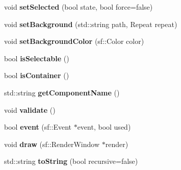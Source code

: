 \begin{DoxyCompactItemize}
\item 
\hypertarget{classgraphics_1_1_container_afb415c1dbd0819dbe0d5ce5dba9e01bc}{void {\bfseries set\-Selected} (bool state, bool force=false)}\label{classgraphics_1_1_container_afb415c1dbd0819dbe0d5ce5dba9e01bc}

\item 
\hypertarget{classgraphics_1_1_container_a6379c94dbd3514a2fb4037f940af52a8}{void {\bfseries set\-Background} (std\-::string path, Repeat repeat)}\label{classgraphics_1_1_container_a6379c94dbd3514a2fb4037f940af52a8}

\item 
\hypertarget{classgraphics_1_1_container_a14a6cc948bdc5efea9108f8d24f84a26}{void {\bfseries set\-Background\-Color} (sf\-::\-Color color)}\label{classgraphics_1_1_container_a14a6cc948bdc5efea9108f8d24f84a26}

\item 
\hypertarget{classgraphics_1_1_container_a7f521fac054bff268374d9809b007b40}{bool {\bfseries is\-Selectable} ()}\label{classgraphics_1_1_container_a7f521fac054bff268374d9809b007b40}

\item 
\hypertarget{classgraphics_1_1_container_af5dd92a421ab134e1fdfd7bedc1db7ef}{bool {\bfseries is\-Container} ()}\label{classgraphics_1_1_container_af5dd92a421ab134e1fdfd7bedc1db7ef}

\item 
\hypertarget{classgraphics_1_1_container_a3cb85f7e3cb06045015d4c49881ac9ba}{std\-::string {\bfseries get\-Component\-Name} ()}\label{classgraphics_1_1_container_a3cb85f7e3cb06045015d4c49881ac9ba}

\item 
\hypertarget{classgraphics_1_1_container_a72ab38a8328ff86a4bf272d6634d7f0d}{void {\bfseries validate} ()}\label{classgraphics_1_1_container_a72ab38a8328ff86a4bf272d6634d7f0d}

\item 
\hypertarget{classgraphics_1_1_container_a11326828e1bcf869654bd69ff40129ff}{bool {\bfseries event} (sf\-::\-Event $\ast$event, bool used)}\label{classgraphics_1_1_container_a11326828e1bcf869654bd69ff40129ff}

\item 
\hypertarget{classgraphics_1_1_container_ae3629f403fa5a48ef1b0f453e702ca3c}{void {\bfseries draw} (sf\-::\-Render\-Window $\ast$render)}\label{classgraphics_1_1_container_ae3629f403fa5a48ef1b0f453e702ca3c}

\item 
\hypertarget{classgraphics_1_1_container_a8a2b6173bfa1c2c554054842144bb526}{std\-::string {\bfseries to\-String} (bool recursive=false)}\label{classgraphics_1_1_container_a8a2b6173bfa1c2c554054842144bb526}

\end{DoxyCompactItemize}
